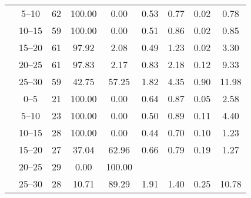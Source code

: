 \begin{table}[htb]
{\begin{tabular}{ccccccccc}
                                 & \SIrange{5}{10}{}               & 62                      & 100.00            & 0.00              & 0.53                              & 0.77 & 0.02 & 0.78  \\
                                 & \SIrange{10}{15}{}              & 59                      & 100.00            & 0.00              & 0.51                              & 0.86 & 0.02 & 0.85  \\
                                 & \SIrange{15}{20}{}              & 61                      & 97.92             & 2.08              & 0.49                              & 1.23 & 0.02 & 3.30  \\
                                 & \SIrange{20}{25}{}              & 61                      & 97.83             & 2.17              & 0.83                              & 2.18 & 0.12 & 9.33  \\
                                 & \SIrange{25}{30}{}              & 59                      & 42.75             & 57.25             & 1.82                              & 4.35 & 0.90 & 11.98 \\
            \addlinespace
            \multirow{6}{*}{C}   & \SIrange{0}{5}{}                & 21                      & 100.00            & 0.00              & 0.64                              & 0.87 & 0.05 & 2.58  \\
                                 & \SIrange{5}{10}{}               & 23                      & 100.00            & 0.00              & 0.50                              & 0.89 & 0.11 & 4.40  \\
                                 & \SIrange{10}{15}{}              & 28                      & 100.00            & 0.00              & 0.44                              & 0.70 & 0.10 & 1.23  \\
                                 & \SIrange{15}{20}{}              & 27                      & 37.04             & 62.96             & 0.66                              & 0.79 & 0.19 & 1.27  \\
                                 & \SIrange{20}{25}{}              & 29                      & 0.00              & 100.00            &                                   &      &      &       \\
                                 & \SIrange{25}{30}{}              & 28                      & 10.71             & 89.29             & 1.91                              & 1.40 & 0.25 & 10.78 \\
            \bottomrule
        \end{tabular}
    }
\end{table}
